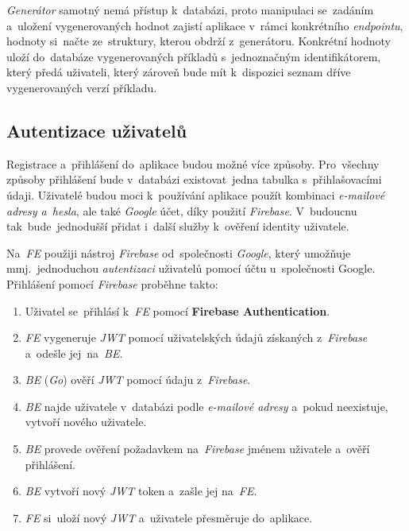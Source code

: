 \documentclass[11pt,a4paper]{report}
\let\oldacrshort\acrshort
\renewcommand{\acrshort}[1]{\emph{\normalsize\color[rgb]{0,0,0}\noindent\oldacrshort{#1}}}
\begin{document}
            \emph{Generátor} samotný nemá přístup k~databázi, proto manipulaci se~zadáním a~uložení vygenerovaných hodnot zajistí aplikace v~rámci konkrétního \emph{endpointu}, hodnoty si~načte ze~struktury, kterou obdrží z~generátoru. Konkrétní hodnoty uloží do~databáze vygenerovaných příkladů s~jednoznačným identifikátorem, který předá uživateli, který zároveň bude mít k~dispozici seznam dříve vygenerovaných verzí příkladu.

        \subsection{Autentizace uživatelů}
            Registrace a~přihlášení do~aplikace budou možné více způsoby. Pro~všechny způsoby přihlášení bude v~databázi existovat~jedna tabulka s~přihlašovacími údaji. Uživatelé budou moci k~používání aplikace použít kombinaci \emph{e-mailové adresy a~hesla}, ale také \emph{Google} účet, díky použití \emph{Firebase}. V~budoucnu tak~bude~jednodušší přidat i~další služby k~ověření identity uživatele.
            
            Na~\acrshort{FE} použiji nástroj \emph{Firebase} od~společnosti \emph{Google}, který umožňuje mmj.~jednoduchou \emph{autentizaci} uživatelů pomocí účtu u~společnosti Google. Přihlášení pomocí \emph{Firebase} proběhne takto:
            \begin{enumerate}
                \item Uživatel se~přihlásí k~\acrshort{FE} pomocí \textbf{Firebase Authentication}.
                \item \acrshort{FE} vygeneruje \acrshort{JWT} pomocí uživatelských údajů získaných z~\emph{Firebase} a~odešle jej~na~\acrshort{BE}.
                \item \acrshort{BE} (\emph{Go}) ověří \acrshort{JWT} pomocí údaju z~\emph{Firebase}.
                \item \acrshort{BE} najde uživatele v~databázi podle \emph{e-mailové adresy} a~pokud neexistuje, vytvoří nového uživatele.
                \item \acrshort{BE} provede ověření požadavkem na~\emph{Firebase} jménem uživatele a~ověří přihlášení.
                \item \acrshort{BE} vytvoří nový \acrshort{JWT} token a~zašle jej na~\acrshort{FE}.
                \item \acrshort{FE} si~uloží nový \acrshort{JWT} a~uživatele přesměruje do~aplikace.
            \end{enumerate}
            
\end{document}

